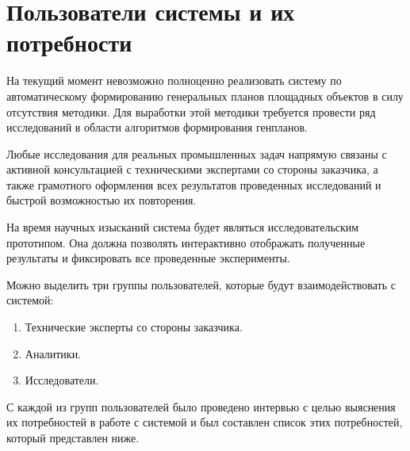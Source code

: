 \section{\Large{Пользователи системы и их потребности}}

На текущий момент невозможно полноценно реализовать систему по автоматическому
формированию генеральных планов площадных объектов в силу отсутствия методики.
Для выработки этой методики требуется провести ряд исследований в области
алгоритмов формирования генпланов.

Любые исследования для реальных промышленных задач напрямую связаны с активной консультацией с техническими
экспертами со стороны заказчика, а также грамотного оформления всех результатов проведенных исследований
и быстрой возможностью их повторения.

На время научных изысканий система будет являться исследовательским прототипом.
Она должна позволять интерактивно отображать полученные результаты и фиксировать все проведенные эксперименты.

Можно выделить три группы пользователей, которые будут взаимодействовать с системой:
\begin{enumerate}
    \item Технические эксперты со стороны заказчика.
    \item Аналитики.
    \item Исследователи.
\end{enumerate}

С каждой из групп пользователей было проведено интервью с целью выяснения их потребностей в работе с системой
и был составлен список этих потребностей, который представлен ниже.

